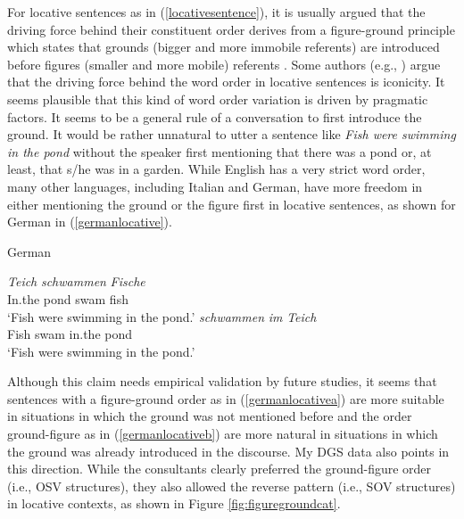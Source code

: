 \largerpage
\noindent For locative sentences as in (\ref{locativesentence}), it is usually argued that the driving force behind their constituent order derives from a figure-ground principle which states that grounds (bigger and more immobile referents) are introduced before figures (smaller and more mobile) referents \citep{volterra1984italian,kimmelman2012word,pfau2016simple}. Some authors (e.g., \citealt{perniss2007space, ozyurek2010locative}) argue that the driving force behind the word order in locative sentences is iconicity. It seems plausible that this kind of word order variation is driven by pragmatic factors. It seems to be a general rule of a conversation to first introduce the ground. It would be rather unnatural to utter a sentence like \textit{Fish were swimming in the pond} without the speaker first mentioning that there was a pond or, at least, that s/he was in a garden. While English has a very strict word order, many other languages, including Italian and German, have more freedom in either mentioning the ground or the figure first in locative sentences, as shown for German in (\ref{germanlocative}).

\begin{exe}
\ex German \label{germanlocative}\begin{xlist}
\ex {} {\textit{Teich}} {\textit{schwammen}} {\textit{Fische}}\\
{In.the} {pond} {swam} {fish}  \\
\trans `Fish were swimming in the pond.' \label{germanlocativea}
\ex {} {\textit{schwammen}} {\textit{im}} {\textit{Teich}}  \\
{Fish} {swam} {in.the} {pond} \\
\trans `Fish were swimming in the pond.' \label{germanlocativeb}

\end{xlist}
\end{exe}




\noindent Although this claim needs empirical validation by future studies, it seems that sentences with a figure-ground order as in (\ref{germanlocativea}) are more suitable in situations in which the ground was not mentioned before and the order ground-figure as in  (\ref{germanlocativeb}) are more natural in situations in which the ground was already introduced in the discourse. My DGS data also points in this direction. While the consultants clearly preferred the ground-figure order (i.e., OSV structures), they also allowed the reverse pattern (i.e., SOV structures) in locative contexts, as shown in  Figure \ref{fig:figuregroundcat}.

